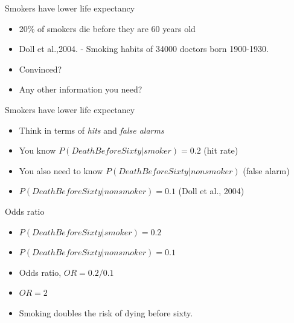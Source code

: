 \documentclass{beamer}
\begin{document}
\begin{frame}{Smokers have lower life expectancy}
\begin{itemize}

\item 20\% of smokers die before they are 60 years old 
\item Doll et al.,2004. - Smoking habits of 34000 doctors born 1900-1930.

\item Convinced?
\item Any other information you need?
\end{itemize}
\end{frame}

\begin{frame}{Smokers have lower life expectancy}
\begin{itemize}

\item Think in terms of \emph{hits} and \emph{false alarms}
\item You know $P(DeathBeforeSixty|smoker) = 0.2 $ (hit rate)
\item You also need to know $P(DeathBeforeSixty|nonsmoker)$ (false alarm)
\item $P(DeathBeforeSixty|nonsmoker) = 0.1 $ (Doll et al., 2004)
\end{itemize}
\end{frame}

\begin{frame}{Odds ratio}
\begin{itemize}

\item $P(DeathBeforeSixty|smoker) = 0.2 $ 
\item $P(DeathBeforeSixty|nonsmoker) = 0.1 $ 
\item Odds ratio, $OR = 0.2 / 0.1 $
\item $OR = 2$
\item Smoking doubles the risk of dying before sixty. 
\end{itemize}
\end{frame}
\end{document}
